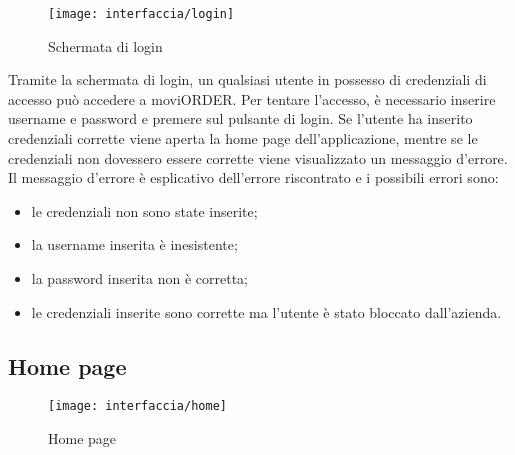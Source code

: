 \begin{figure}[!h] 
    \centering 
    \texttt{[image: interfaccia/login]} 
    \caption{Schermata di login}
\end{figure}

Tramite la schermata di login, un qualsiasi utente in possesso di credenziali di accesso può accedere a moviORDER. Per tentare l'accesso, è necessario inserire username e password e premere sul pulsante di login. Se l'utente ha inserito credenziali corrette viene aperta la home page dell'applicazione, mentre se le credenziali non dovessero essere corrette viene visualizzato un messaggio d'errore. Il messaggio d'errore è esplicativo dell'errore riscontrato e i possibili errori sono:
\begin{itemize}
	\item le credenziali non sono state inserite;
	\item la username inserita è inesistente;
	\item la password inserita non è corretta;
	\item le credenziali inserite sono corrette ma l'utente è stato bloccato dall'azienda.
\end{itemize}

\subsection{Home page}

\begin{figure}[!h] 
    \centering 
    \texttt{[image: interfaccia/home]} 
    \caption{Home page}
\end{figure}

